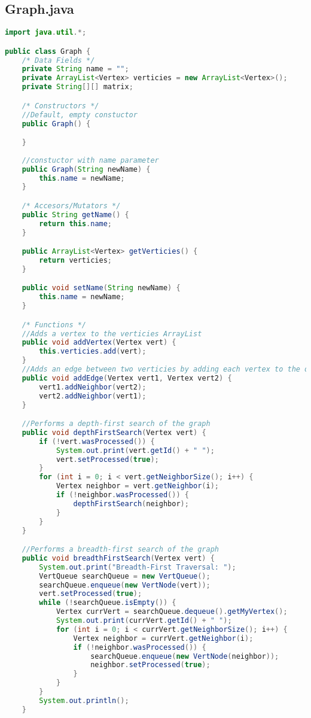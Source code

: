\documentclass[letterpaper, 10pt,DIV=13]{scrartcl}
\numberwithin{equation}{section} %
\numberwithin{figure}{section} %
\numberwithin{table}{section} %
\begin{document}
\subsection{Graph.java}
\begin{lstlisting}[frame=single, language=java, breaklines]  
import java.util.*;

public class Graph {
    /* Data Fields */
    private String name = "";
    private ArrayList<Vertex> verticies = new ArrayList<Vertex>();
    private String[][] matrix;

    /* Constructors */
    //Default, empty constuctor
    public Graph() {

    }
    
    //constuctor with name parameter
    public Graph(String newName) {
        this.name = newName;
    }

    /* Accesors/Mutators */
    public String getName() {
        return this.name;
    }

    public ArrayList<Vertex> getVerticies() {
        return verticies;
    }

    public void setName(String newName) {
        this.name = newName;
    }

    /* Functions */
    //Adds a vertex to the verticies ArrayList
    public void addVertex(Vertex vert) {
        this.verticies.add(vert);
    }
    //Adds an edge between two verticies by adding each vertex to the other's list of neighbors
    public void addEdge(Vertex vert1, Vertex vert2) {
        vert1.addNeighbor(vert2);
        vert2.addNeighbor(vert1);
    }

    //Performs a depth-first search of the graph
    public void depthFirstSearch(Vertex vert) {
        if (!vert.wasProcessed()) {
            System.out.print(vert.getId() + " ");
            vert.setProcessed(true);
        }
        for (int i = 0; i < vert.getNeighborSize(); i++) {
            Vertex neighbor = vert.getNeighbor(i);
            if (!neighbor.wasProcessed()) {
                depthFirstSearch(neighbor);
            }   
        }
    }

    //Performs a breadth-first search of the graph
    public void breadthFirstSearch(Vertex vert) {
        System.out.print("Breadth-First Traversal: ");
        VertQueue searchQueue = new VertQueue();
        searchQueue.enqueue(new VertNode(vert));
        vert.setProcessed(true);
        while (!searchQueue.isEmpty()) {
            Vertex currVert = searchQueue.dequeue().getMyVertex();
            System.out.print(currVert.getId() + " ");
            for (int i = 0; i < currVert.getNeighborSize(); i++) {
                Vertex neighbor = currVert.getNeighbor(i);
                if (!neighbor.wasProcessed()) {
                    searchQueue.enqueue(new VertNode(neighbor));
                    neighbor.setProcessed(true);
                }
            }
        }
        System.out.println();
    }


\end{lstlisting}
\end{document}
